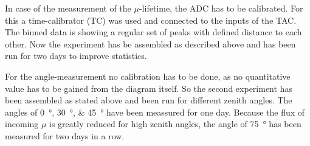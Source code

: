 	In case of the measurement of the $\mu$-lifetime, the ADC has to be calibrated.
	For this a time-calibrator (TC) was used and connected to the inputs of the TAC.
	The binned data is showing a regular set of peaks with defined distance to each other.
	Now the experiment has be assembled as described above and has been run for two days to improve statistics.
	
	For the angle-measurement no calibration has to be done, as no quantitative value has to be gained from the diagram itself.
	So the second experiment has been assembled as stated above and been run for different zenith angles.
	The angles of \SIlist{0;30;45}{\degree} have been meassured for one day.
	Because the flux of incoming $\mu$ is greatly reduced for high zenith angles, the angle of \SI{75}{\degree} has been measured for two days in a row.
	

%
